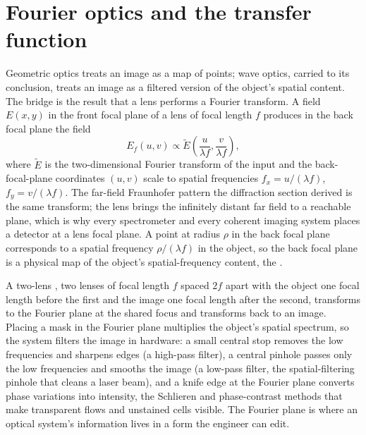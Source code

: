 \section{Fourier optics and the transfer function}

Geometric optics treats an image as a map of points; wave optics, carried to its
conclusion, treats an image as a filtered version of the object's spatial
content. The bridge is the result that a lens performs a Fourier transform. A
field $E(x,y)$ in the front focal plane of a lens of focal length $f$ produces in
the back focal plane the field
\[
E_f(u,v) \propto \widetilde{E}\!\left(\frac{u}{\lambda f},
\frac{v}{\lambda f}\right),
\]
where $\widetilde{E}$ is the two-dimensional Fourier transform of the input and
the back-focal-plane coordinates $(u,v)$ scale to spatial frequencies
$f_x = u/(\lambda f)$, $f_y = v/(\lambda f)$. The far-field Fraunhofer pattern
the diffraction section derived is the same transform; the lens brings the
infinitely distant far field to a reachable plane, which is why every
spectrometer and every coherent imaging system places a detector at a lens focal
plane. A point at radius $\rho$ in the back focal plane corresponds to a spatial
frequency $\rho/(\lambda f)$ in the object, so the back focal plane is a physical
map of the object's spatial-frequency content, the .

A two-lens , two lenses of focal length $f$ spaced $2f$ apart
with the object one focal length before the first and the image one focal length
after the second, transforms to the Fourier plane at the shared focus and
transforms back to an image. Placing a mask in the Fourier plane multiplies the
object's spatial spectrum, so the system filters the image in hardware: a small
central stop removes the low frequencies and sharpens edges (a high-pass filter),
a central pinhole passes only the low frequencies and smooths the image (a
low-pass filter, the spatial-filtering pinhole that cleans a laser beam), and a
knife edge at the Fourier plane converts phase variations into intensity, the
Schlieren and phase-contrast methods that make transparent flows and unstained
cells visible. The Fourier plane is where an optical system's information lives in
a form the engineer can edit.

